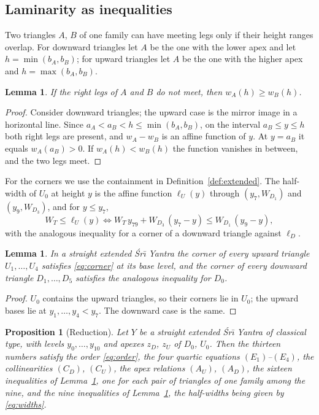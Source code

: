 \documentclass[11pt,a4paper]{article}
\newtheorem{proposition}[theorem]{Proposition}
\newtheorem{lemma}[theorem]{Lemma}
\theoremstyle{definition}
\theoremstyle{remark}
\newcommand{\Sri}{\'Sr\={\i}}
\newcommand{\yy}[2]{y_{#1#2}}
\begin{document}
\subsection{Laminarity as inequalities}

Two triangles $A$, $B$ of one family can have meeting legs only if their height ranges overlap. For
downward triangles let $A$ be the one with the lower apex and let $h = \min(b_A, b_B)$; for upward
triangles let $A$ be the one with the higher apex and $h = \max(b_A, b_B)$.

\begin{lemma}\label{lem:nc}
If the right legs of $A$ and $B$ do not meet, then $w_A(h) \ge w_B(h)$.
\end{lemma}

\begin{proof}
Consider downward triangles; the upward case is the mirror image in a horizontal line. Since
$a_A < a_B < h \le \min(b_A, b_B)$, on the interval $a_B \le y \le h$ both right legs are present, and
$w_A - w_B$ is an affine function of $y$. At $y = a_B$ it equals $w_A(a_B) > 0$. If $w_A(h) < w_B(h)$ the
function vanishes in between, and the two legs meet.
\end{proof}

For the corners we use the containment in Definition~\ref{def:extended}. The half-width of $U_0$ at height
$y$ is the affine function $\ell_U(y)$ through $(y_7, W_{D_1})$ and $(y_9, W_{D_3})$, and for $y \le y_7$,
\begin{equation}\label{eq:corner}
W_T \le \ell_U(y) \iff W_T\,\yy79 + W_{D_3}\,(y_7 - y) \le W_{D_1}\,(y_9 - y),
\end{equation}
with the analogous inequality for a corner of a downward triangle against $\ell_D$.

\begin{lemma}\label{lem:corners}
In a straight extended \Sri{} Yantra the corner of every upward triangle $U_1, \dots, U_4$ satisfies
\eqref{eq:corner} at its base level, and the corner of every downward triangle $D_1,\dots,D_5$ satisfies
the analogous inequality for $D_0$.
\end{lemma}

\begin{proof}
$U_0$ contains the upward triangles, so their corners lie in $U_0$; the upward bases lie at
$y_1, \dots, y_4 < y_7$. The downward case is the same.
\end{proof}

\begin{proposition}[Reduction]\label{prop:reduction}
Let $Y$ be a straight extended \Sri{} Yantra of classical type, with levels $y_0, \dots, y_{10}$ and
apexes $z_D$, $z_U$ of $D_0$, $U_0$. Then the thirteen numbers satisfy the order \eqref{eq:order}, the four
quartic equations $(E_1)$--$(E_4)$, the collinearities $(C_D)$, $(C_U)$, the apex relations $(A_U)$,
$(A_D)$, the sixteen inequalities of Lemma~\ref{lem:nc}, one for each pair of triangles of one family among
the nine, and the nine inequalities of Lemma~\ref{lem:corners}, the half-widths being given by
\eqref{eq:widths}.
\end{proposition}
\end{document}
